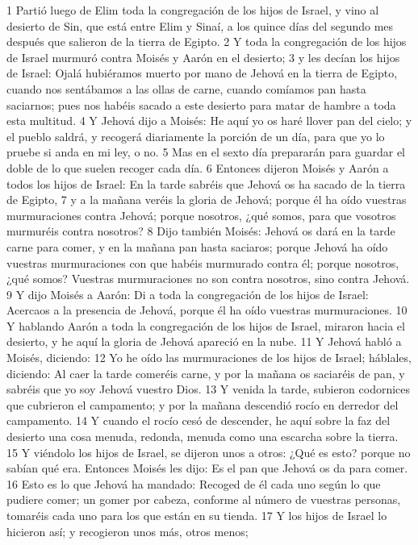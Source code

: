1 Partió luego de Elim toda la congregación de los hijos de Israel, y vino al desierto de Sin, que está entre Elim y Sinaí, a los quince días del segundo mes después que salieron de la tierra de Egipto.
2 Y toda la congregación de los hijos de Israel murmuró contra Moisés y Aarón en el desierto;
3 y les decían los hijos de Israel: Ojalá hubiéramos muerto por mano de Jehová en la tierra de Egipto, cuando nos sentábamos a las ollas de carne, cuando comíamos pan hasta saciarnos; pues nos habéis sacado a este desierto para matar de hambre a toda esta multitud.
4 Y Jehová dijo a Moisés: He aquí yo os haré llover pan del cielo; y el pueblo saldrá, y recogerá diariamente la porción de un día, para que yo lo pruebe si anda en mi ley, o no.
5 Mas en el sexto día prepararán para guardar el doble de lo que suelen recoger cada día.
6 Entonces dijeron Moisés y Aarón a todos los hijos de Israel: En la tarde sabréis que Jehová os ha sacado de la tierra de Egipto,
7 y a la mañana veréis la gloria de Jehová; porque él ha oído vuestras murmuraciones contra Jehová; porque nosotros, ¿qué somos, para que vosotros murmuréis contra nosotros?
8 Dijo también Moisés: Jehová os dará en la tarde carne para comer, y en la mañana pan hasta saciaros; porque Jehová ha oído vuestras murmuraciones con que habéis murmurado contra él; porque nosotros, ¿qué somos? Vuestras murmuraciones no son contra nosotros, sino contra Jehová.
9 Y dijo Moisés a Aarón: Di a toda la congregación de los hijos de Israel: Acercaos a la presencia de Jehová, porque él ha oído vuestras murmuraciones.
10 Y hablando Aarón a toda la congregación de los hijos de Israel, miraron hacia el desierto, y he aquí la gloria de Jehová apareció en la nube.
11 Y Jehová habló a Moisés, diciendo:
12 Yo he oído las murmuraciones de los hijos de Israel; háblales, diciendo: Al caer la tarde comeréis carne, y por la mañana os saciaréis de pan, y sabréis que yo soy Jehová vuestro Dios.
13 Y venida la tarde, subieron codornices que cubrieron el campamento; y por la mañana descendió rocío en derredor del campamento.
14 Y cuando el rocío cesó de descender, he aquí sobre la faz del desierto una cosa menuda, redonda, menuda como una escarcha sobre la tierra.
15 Y viéndolo los hijos de Israel, se dijeron unos a otros: ¿Qué es esto? porque no sabían qué era. Entonces Moisés les dijo: Es el pan que Jehová os da para comer.
16 Esto es lo que Jehová ha mandado: Recoged de él cada uno según lo que pudiere comer; un gomer por cabeza, conforme al número de vuestras personas, tomaréis cada uno para los que están en su tienda.
17 Y los hijos de Israel lo hicieron así; y recogieron unos más, otros menos;
